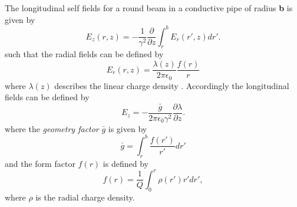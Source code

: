 















The longitudinal self fields for a round beam in a conductive pipe of radius \textbf{b} is given by
$$E_z(r, z) = -\frac{1}{\gamma^2}\frac{\partial}{\partial z}\int_r^bE_r(r', z)dr'.$$ such that the radial fields can be defined by $$E_r(r, z) = \frac{\lambda(z)}{2\pi\epsilon_0}\frac{f(r)}{r}$$ where $\lambda(z)$ describes the linear charge density \cite{ferrario_space_2014}. Accordingly the longitudinal fields can be defined by
\begin{equation}
    E_z = -\frac{\bar{g}}{2\pi\epsilon_0\gamma^2}\frac{\partial \lambda}{\partial z}
    \label{eq:longitudinal_self_fields}.
\end{equation} where the \textit{geometry factor} \cite{zotter_impedances_1998} $\bar{g}$ is given by
$$\bar{g} = \int_r^b\frac{f(r')}{r'}dr'$$ and the form factor $f(r)$ is defined by $$f(r) =  \frac{1}{Q}\int_0^r \rho(r') r' dr',$$  where $\rho$ is the radial charge density.

